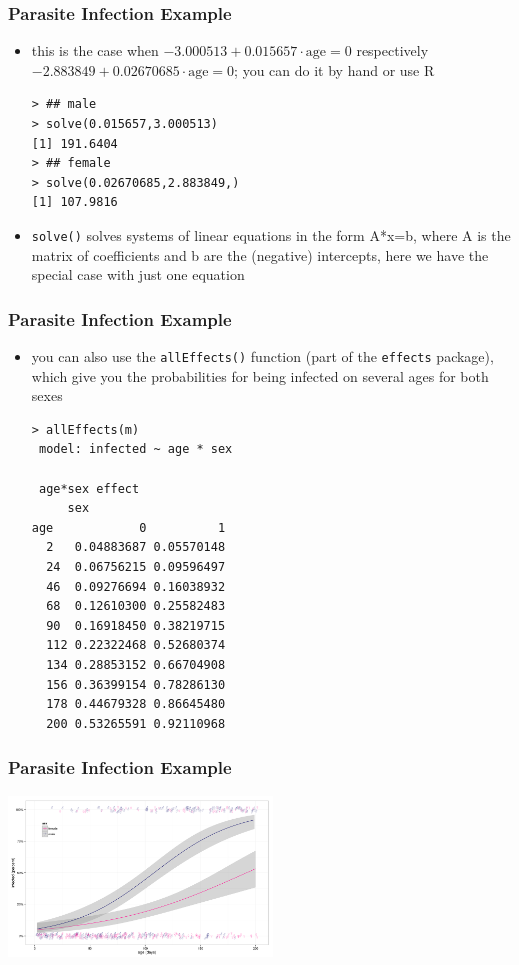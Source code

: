\begin{frame}[fragile]\frametitle{Parasite Infection Example}
\begin{itemize}
\item this is the case when $-3.000513 + 0.015657 \cdot \mbox{age}=0$  respectively $-2.883849 + 0.02670685  \cdot \mbox{age}=0$; you can do it by hand or use R\small
\begin{verbatim}
> ## male
> solve(0.015657,3.000513)
[1] 191.6404
> ## female
> solve(0.02670685,2.883849,)
[1] 107.9816
\end{verbatim}
\normalsize
\item \texttt{solve()} solves systems of linear equations in the form A*x=b, where A is the matrix of coefficients and b are the (negative) intercepts, here we have the special case with just one equation
\end{itemize}
\end{frame}

\begin{frame}[fragile]\frametitle{Parasite Infection Example}
\begin{itemize}
\item you can also use the \texttt{allEffects()} function (part of the \texttt{effects} package), which give you the probabilities for being infected on several ages for both sexes\footnotesize
\begin{verbatim}
> allEffects(m)
 model: infected ~ age * sex

 age*sex effect
     sex
age            0          1
  2   0.04883687 0.05570148
  24  0.06756215 0.09596497
  46  0.09276694 0.16038932
  68  0.12610300 0.25582483
  90  0.16918450 0.38219715
  112 0.22322468 0.52680374
  134 0.28853152 0.66704908
  156 0.36399154 0.78286130
  178 0.44679328 0.86645480
  200 0.53265591 0.92110968
\end{verbatim}
\end{itemize}
\end{frame}


\begin{frame}[fragile]\frametitle{Parasite Infection Example}
\begin{center}
\includegraphics[width=7cm]{binancova1.png}
\end{center}
\end{frame}

